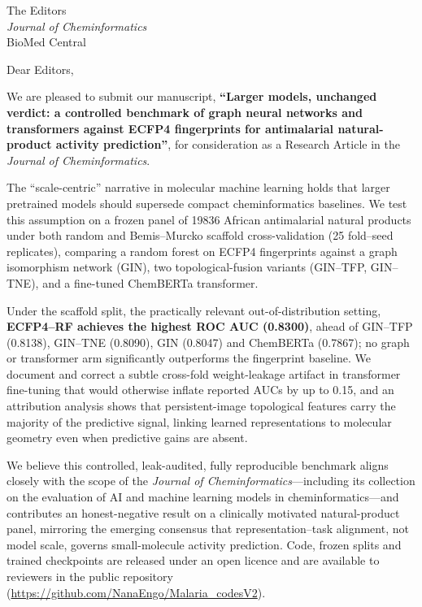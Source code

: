 \documentclass[11pt,a4paper]{letter}
\begin{document}
\begin{letter}{%
  The Editors \\
  \textit{Journal of Cheminformatics} \\
  BioMed Central
}

\opening{Dear Editors,}

We are pleased to submit our manuscript, \textbf{``Larger models, unchanged verdict: a controlled benchmark of graph neural networks and transformers against ECFP4 fingerprints for antimalarial natural-product activity prediction''}, for consideration as a Research Article in the \textit{Journal of Cheminformatics}.

The ``scale-centric'' narrative in molecular machine learning holds that larger pretrained models should supersede compact cheminformatics baselines. We test this assumption on a frozen panel of \num{19836} African antimalarial natural products under both random and Bemis--Murcko scaffold cross-validation (\num{25} fold--seed replicates), comparing a random forest on ECFP4 fingerprints against a graph isomorphism network (GIN), two topological-fusion variants (GIN--TFP, GIN--TNE), and a fine-tuned ChemBERTa transformer.

Under the scaffold split, the practically relevant out-of-distribution setting, \textbf{ECFP4--RF achieves the highest ROC AUC (\num{0.8300})}, ahead of GIN--TFP (\num{0.8138}), GIN--TNE (\num{0.8090}), GIN (\num{0.8047}) and ChemBERTa (\num{0.7867}); no graph or transformer arm significantly outperforms the fingerprint baseline. We document and correct a subtle cross-fold weight-leakage artifact in transformer fine-tuning that would otherwise inflate reported AUCs by up to \num{0.15}, and an attribution analysis shows that persistent-image topological features carry the majority of the predictive signal, linking learned representations to molecular geometry even when predictive gains are absent.

We believe this controlled, leak-audited, fully reproducible benchmark aligns closely with the scope of the \textit{Journal of Cheminformatics}---including its collection on the evaluation of AI and machine learning models in cheminformatics---and contributes an honest-negative result on a clinically motivated natural-product panel, mirroring the emerging consensus that representation--task alignment, not model scale, governs small-molecule activity prediction. Code, frozen splits and trained checkpoints are released under an open licence and are available to reviewers in the public repository (\url{https://github.com/NanaEngo/Malaria_codesV2}).


\end{letter}
\end{document}
